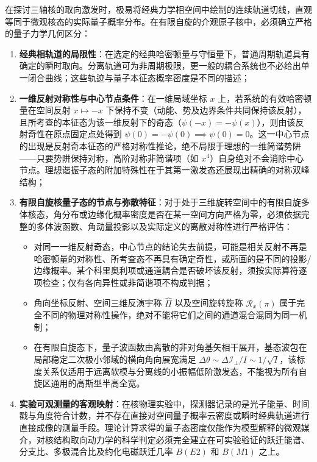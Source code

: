 在探讨三轴核的取向激发时，极易将经典力学相空间中绘制的连续轨道切线，直观等同于微观核态的实际量子概率分布。在有限自旋的介观原子核中，必须确立严格的量子力学几何区分：
\begin{enumerate}
\item \textbf{经典相轨道的局限性}：在选定的经典哈密顿量与守恒量下，普通周期轨道具有确定的瞬时取向。分离轨道可为非周期极限，更一般的耦合系统也不必给出单一闭合曲线；这些轨迹与量子本征态概率密度是不同的描述；
\item \textbf{一维反射对称性与中心节点条件}：在一维局域坐标 $x$ 上，若系统的有效哈密顿量在空间反射 $x \mapsto -x$ 下保持不变（动能、势及边界条件共同保持该反射），且所考查的本征态为该一维反射下的奇态（$\psi(-x) = -\psi(x)$），则由该反射奇性在原点固定点处得到 $\psi(0) = -\psi(0) \implies \psi(0) = 0$。这一中心节点的出现是反射奇本征态的严格对称性推论，绝不局限于理想的一维简谐势阱——只要势阱保持对称，高阶对称非简谐项（如 $x^4$）自身绝对不会消除中心节点。理想谐振子态的附加特殊性在于其第一激发态还展现出精确的对称双峰结构；
\item \textbf{有限自旋核量子态的节点与弥散特征}：对于处于三维旋转空间中的有限自旋多体核态，角分布或边缘化概率密度是否在某一空间方向严格为零，必须依据完整的多体波函数、角动量投影以及实际定义的离散对称性进行严格评估：
\begin{itemize}
\item 对同一一维反射奇态，中心节点的结论失去前提，可能是相关反射不再是哈密顿量的对称性、所考查态不再具有确定奇性，或所画的是不同的投影/边缘概率。某个科里奥利项或通道耦合是否破坏该反射，须按实际算符逐项检查；仅有各向异性或非简谐项不构成判据；
\item 角向坐标反射、空间三维反演宇称 $\hat{\Pi}$ 以及空间旋转旋称 $\mathcal{R}_x(\pi)$ 属于完全不同的物理对称性操作，绝对不能将它们之间的通道混合混同为同一机制；
\item 在有限自旋态下，量子波函数由离散的非对角基矢相干展开，基态波包在局部稳定二次极小邻域的横向角向展宽满足 $\Delta \theta \sim \Delta \mathcal{I}_\perp / I \sim 1/\sqrt{I}$，该标度关系仅适用于远离软模与分离线的小振幅低阶激发态，不能视为所有自旋区通用的高斯型半高全宽。
\end{itemize}
\item \textbf{实验可观测量的客观映射}：在核物理实验中，探测器记录的是光子能量、时间戳与角度符合计数，并不存在直接对空间量子概率云密度或瞬时经典轨道进行直接成像的测量手段。理论计算求得的量子态密度仅能作为模型解释的微观媒介，对核结构取向动力学的科学判定必须完全建立在可实验验证的跃迁能谱、分支比、多极混合比及约化电磁跃迁几率 $B(E2)$ 和 $B(M1)$ 之上。
\end{enumerate}

